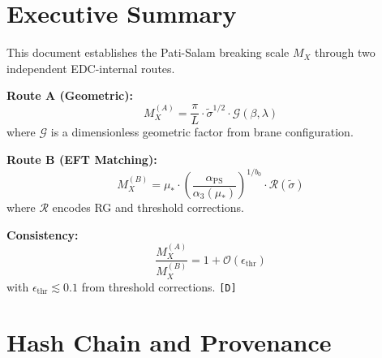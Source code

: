 \documentclass[11pt,a4paper]{article}
\newcommand{\tagD}{\textcolor{green!50!black}{\texttt{[D]}}}
\theoremstyle{definition}
\begin{document}
\tableofcontents
\newpage

\section{Executive Summary}
\label{sec:executive}


\begin{canonbox}
This document establishes the Pati-Salam breaking scale $M_X$ through two
independent EDC-internal routes.

\textbf{Route A (Geometric):}
\begin{equation}
\label{eq:mx-route-a-summary}
\boxed{M_X^{(A)} = \frac{\pi}{L} \cdot \tilde{\sigma}^{1/2} \cdot \mathcal{G}(\beta, \lambda)}
\end{equation}
where $\mathcal{G}$ is a dimensionless geometric factor from brane configuration.

\textbf{Route B (EFT Matching):}
\begin{equation}
\label{eq:mx-route-b-summary}
\boxed{M_X^{(B)} = \mu_* \cdot \left(\frac{\alpha_{\text{PS}}}{\alpha_3(\mu_*)}\right)^{1/b_0} \cdot \mathcal{R}(\tilde{\sigma})}
\end{equation}
where $\mathcal{R}$ encodes RG and threshold corrections.

\textbf{Consistency:}
\begin{equation}
\label{eq:two-route-consistency-summary}
\frac{M_X^{(A)}}{M_X^{(B)}} = 1 + \mathcal{O}(\epsilon_{\text{thr}})
\end{equation}
with $\epsilon_{\text{thr}} \lesssim 0.1$ from threshold corrections. \tagD{}
\end{canonbox}

\section{Hash Chain and Provenance}
\label{sec:hashchain}
\end{document}
